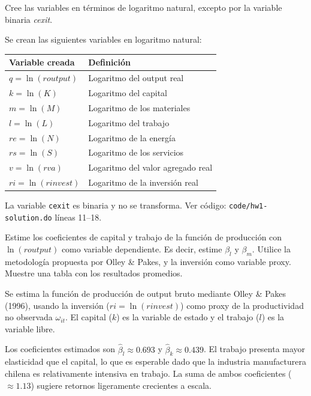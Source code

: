 \documentclass[answers]{exam}
\begin{document}
\begin{questions}

\question Cree las variables en términos de logaritmo natural, excepto por la variable binaria \textit{cexit}.

\begin{solution}
Se crean las siguientes variables en logaritmo natural:

\begin{center}
\begin{tabular}{ll}
\toprule
Variable creada & Definición \\
\midrule
$q  = \ln(\mathit{routput})$ & Logaritmo del output real \\
$k  = \ln(K)$               & Logaritmo del capital \\
$m  = \ln(M)$               & Logaritmo de los materiales \\
$l  = \ln(L)$               & Logaritmo del trabajo \\
$re = \ln(N)$               & Logaritmo de la energía \\
$rs = \ln(S)$               & Logaritmo de los servicios \\
$v  = \ln(\mathit{rva})$    & Logaritmo del valor agregado real \\
$ri = \ln(\mathit{rinvest})$& Logaritmo de la inversión real \\
\bottomrule
\end{tabular}
\end{center}

La variable \texttt{cexit} es binaria y no se transforma. Ver código: \texttt{code/hw1-solution.do} líneas 11--18.
\end{solution}

\question Estime los coeficientes de capital y trabajo de la función de producción con $\ln(\mathit{routput})$ como variable dependiente. Es decir, estime $\beta_l$ y $\beta_m$. Utilice la metodología propuesta por Olley \& Pakes, y la inversión como variable proxy. Muestre una tabla con los resultados promedios.

\begin{solution}
Se estima la función de producción de output bruto mediante Olley \& Pakes (1996), usando la inversión ($ri = \ln(\mathit{rinvest})$) como proxy de la productividad no observada $\omega_{it}$. El capital ($k$) es la variable de estado y el trabajo ($l$) es la variable libre.



Los coeficientes estimados son $\hat{\beta}_l \approx 0.693$ y $\hat{\beta}_k \approx 0.439$. El trabajo presenta mayor elasticidad que el capital, lo que es esperable dado que la industria manufacturera chilena es relativamente intensiva en trabajo. La suma de ambos coeficientes ($\approx 1.13$) sugiere retornos ligeramente crecientes a escala.


\end{solution}
\end{questions}
\end{document}

